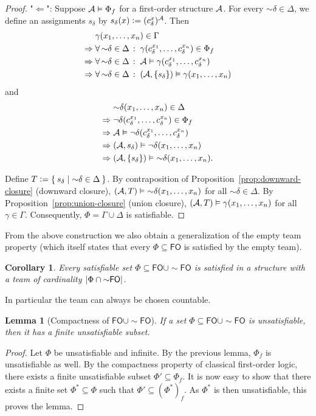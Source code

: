\documentclass[a4paper,english,fleqn,11pt,final]{scrartcl}
\newcommand{\size}[1]{{\protect\ensuremath{\vert\nobreak#1\nobreak\vert}}}
\newcommand{\negg}{{\sim}}
\newcommand{\logic}[1]{\ensuremath{\mathsf{#1}}\xspace}
\newcommand{\FO}{\logic{FO}}
\newcommand{\calA}{\protect\ensuremath{\mathcal{A}}}
\providecommand{\dfn}{\mathrel{\mathop:}=}
\theoremstyle{plain}
\newtheorem{lemma}[theorem]{Lemma}
\newtheorem{corollary}[theorem]{Corollary}
\theoremstyle{definition}
\begin{document}
\begin{proof}
"$\Leftarrow$": Suppose $\calA \vDash \Phi_f$ for a first-order structure $\calA$.
For every $\negg\delta \in \Delta$, we define an assignments $s_\delta$ by $s_\delta(x) \dfn (c^{x}_\delta)^\calA$.
Then
\begin{align*}
	&\gamma(x_1, \ldots, x_n) \in \Gamma\\
	\Rightarrow\;&\forall\, \negg\delta \in \Delta \,:\; \gamma(c^{x_1}_\delta, \ldots, c^{x_n}_\delta)  \in \Phi_f\\
	\Rightarrow\;&\forall\, \negg\delta \in \Delta \,:\; \calA \vDash \gamma(c^{x_1}_\delta, \ldots, c^{x_n}_\delta)\\
	\Rightarrow\;&\forall\, \negg\delta \in \Delta \,:\; (\calA,\{s_\delta\}) \vDash \gamma(x_1,\ldots,x_n)
\end{align*}
and
\begin{align*}
	&\negg \delta(x_1, \ldots, x_n) \in \Delta\\
	\Rightarrow\;&\neg\delta(c^{x_1}_\delta, \ldots, c^{x_n}_\delta)  \in \Phi_f\\
	\Rightarrow\;&\calA \vDash \neg\delta(c^{x_1}_\delta, \ldots, c^{x_n}_\delta)\\
	\Rightarrow\;&(\calA, s_\delta) \vDash \neg\delta(x_1, \ldots, x_n)\\
	\Rightarrow\;&(\calA, \{s_\delta\}) \vDash \negg\delta(x_1, \ldots, x_n)\text{.}
\end{align*}

Define $T \dfn \Set{ s_\delta | \negg\delta \in \Delta}$.
By contraposition of Proposition~\ref{prop:downward-closure} (downward closure), $(\calA,T) \vDash \negg\delta(x_1,\ldots,x_n)$ for all $\negg\delta \in \Delta$.
By Proposition~\ref{prop:union-closure} (union closure), $(\calA, T)\vDash \gamma(x_1,\ldots,x_n)$ for all $\gamma\in \Gamma$.
Consequently, $\Phi = \Gamma \cup \Delta$ is satisfiable.
\end{proof}

From the above construction we also obtain a generalization of the empty team property (which itself states that every $\Phi \subseteq \FO$ is satisfied by the empty team).

\begin{corollary}
Every satisfiable set $\Phi\subseteq\FO \cup \negg\FO$ is satisfied in a structure with a team of cardinality $\size{\Phi\cap\negg\FO}$.
\end{corollary}

In particular the team can always be chosen countable.

\begin{lemma}[Compactness of $\FO \cup \negg \FO$]
	If a set $\Phi \subseteq \FO \cup \negg \FO$ is unsatisfiable, then it has a finite unsatisfiable subset.
\end{lemma}
\begin{proof}
Let $\Phi$ be unsatisfiable and infinite.
By the previous lemma, $\Phi_f$ is unsatisfiable as well.
By the compactness property of classical first-order logic, there exists a finite unsatisfiable subset $\Phi' \subseteq \Phi_f$.
It is now easy to show that there exists a finite set $\Phi^* \subseteq \Phi$ such that $\Phi' \subseteq (\Phi^*)_f$.
As $\Phi^*$ is then unsatisfiable, this proves the lemma.
\end{proof}
\end{document}
